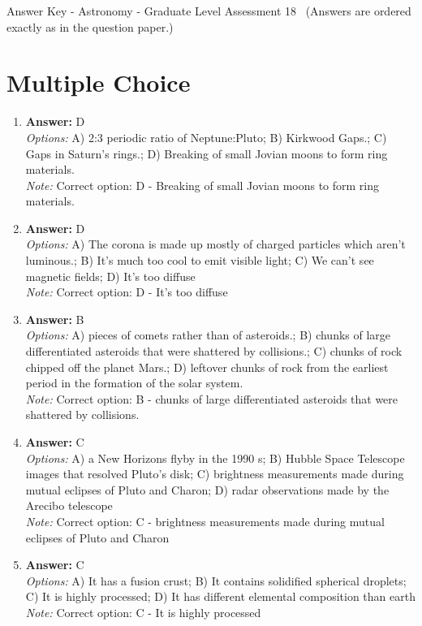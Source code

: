 \documentclass[12pt]{article}
\begin{document}
\begin{center}
Answer Key - Astronomy - Graduate Level Assessment 18 \
\small (Answers are ordered exactly as in the question paper.)
\end{center}

\section*{Multiple Choice}
\begin{enumerate}[label=\arabic*.]
\item \textbf{Answer:} D
\\ \textit{Options:} A) 2:3 periodic ratio of Neptune:Pluto; B) Kirkwood Gaps.; C) Gaps in Saturn's rings.; D) Breaking of small Jovian moons to form ring materials.
\\ \textit{Note:} Correct option: D - Breaking of small Jovian moons to form ring materials.
\item \textbf{Answer:} D
\\ \textit{Options:} A) The corona is made up mostly of charged particles which aren't luminous.; B) It's much too cool to emit visible light; C) We can't see magnetic fields; D) It's too diffuse
\\ \textit{Note:} Correct option: D - It's too diffuse
\item \textbf{Answer:} B
\\ \textit{Options:} A) pieces of comets rather than of asteroids.; B) chunks of large differentiated asteroids that were shattered by collisions.; C) chunks of rock chipped off the planet Mars.; D) leftover chunks of rock from the earliest period in the formation of the solar system.
\\ \textit{Note:} Correct option: B - chunks of large differentiated asteroids that were shattered by collisions.
\item \textbf{Answer:} C
\\ \textit{Options:} A) a New Horizons flyby in the 1990 s; B) Hubble Space Telescope images that resolved Pluto's disk; C) brightness measurements made during mutual eclipses of Pluto and Charon; D) radar observations made by the Arecibo telescope
\\ \textit{Note:} Correct option: C - brightness measurements made during mutual eclipses of Pluto and Charon
\item \textbf{Answer:} C
\\ \textit{Options:} A) It has a fusion crust; B) It contains solidified spherical droplets; C) It is highly processed; D) It has different elemental composition than earth
\\ \textit{Note:} Correct option: C - It is highly processed
\end{enumerate}
\end{document}

